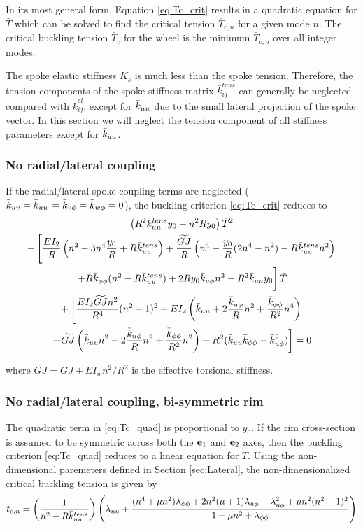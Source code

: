 \documentclass[\rootdir/thesis.tex]{subfiles}
\begin{document}
In its most general form, Equation \eqref{eq:Tc_crit} results in a quadratic equation for $\bar{T}$ which can be solved to find the critical tension $\bar{T}_{c,n}$ for a given mode $n$. The critical buckling tension $\bar{T}_c$ for the wheel is the minimum $\bar{T}_{c,n}$ over all integer modes.

The spoke elastic stiffness $K_s$ is much less than the spoke tension. Therefore, the tension components of the spoke stiffness matrix $\bar{k}_{ij}^{tens}$ can generally be neglected compared with $\bar{k}_{ij}^{el}$, except for $\bar{k}_{uu}$ due to the small lateral projection of the spoke vector. In this section we will neglect the tension component of all stiffness parameters except for $\bar{k}_{uu}$.

\subsubsection*{No radial/lateral coupling}
If the radial/lateral spoke coupling terms are neglected ($\bar{k}_{uv}=\bar{k}_{uw}=\bar{k}_{v\phi}=\bar{k}_{w\phi}=0$), the buckling criterion \eqref{eq:Tc_crit} reduces to
\begin{multline}
\label{eq:Tc_quad}
\left(R^2\bar{k}_{uu}^{tens}y_0 - n^2Ry_0 \right)\bar{T}^2\\
-\left[\frac{EI_2}{R}\left(n^2 - 3n^4 \frac{y_0}{R} + R\bar{k}_{uu}^{tens}\right)
       +\frac{\widetilde{GJ}}{R}\left(n^4 - \frac{y_0}{R}(2n^4 - n^2) - R\bar{k}_{uu}^{tens}n^2\right) \right.\\
       \left. +R\bar{k}_{\phi\phi} (n^2 - R\bar{k}_{uu}^{tens}) + 2Ry_0\bar{k}_{u\phi} n^2 - R^2\bar{k}_{uu} y_0 \vphantom{\frac12} \right]\bar{T}\\
+\left[\frac{EI_2 \widetilde{GJ} n^2}{R^4}(n^2-1)^2
       +EI_2\left(\bar{k}_{uu} + 2\frac{\bar{k}_{u\phi}}{R}n^2 + \frac{\bar{k}_{\phi\phi}}{R^2}n^4\right) \right.\\
       \left. +\widetilde{GJ}\left(\bar{k}_{uu} n^2 + 2\frac{\bar{k}_{u\phi}}{R}n^2 + \frac{\bar{k}_{\phi\phi}}{R^2}n^2\right)
       +R^2(\bar{k}_{uu}\bar{k}_{\phi\phi} - \bar{k}_{u\phi}^2)\right] = 0
\end{multline}

where $\widetilde{GJ} = GJ + EI_wn^2/R^2$ is the effective torsional stiffness.

\subsubsection*{No radial/lateral coupling, bi-symmetric rim}
The quadratic term in \eqref{eq:Tc_quad} is proportional to $y_0$. If the rim cross-section is assumed to be symmetric across both the $\mathbf{e}_1$ and $\mathbf{e}_2$ axes, then the buckling criterion \eqref{eq:Tc_quad} reduces to a linear equation for $\bar{T}$. Using the non-dimensional paremeters defined in Section \ref{sec:Lateral}, the non-dimensionalized critical buckling tension is given by
\begin{equation}
\label{eq:Tcn_lin}
t_{c,n} = \left(\frac{1}{n^2 - R\bar{k}_{uu}^{tens}}\right)
\left(\lambda_{uu}
      +\frac{(n^4 + \mu n^2)\lambda_{\phi\phi}
             +2n^2(\mu + 1)\lambda_{u\phi} - \lambda_{u\phi}^2
             +\mu n^2(n^2-1)^2}
        {1 + \mu n^2 + \lambda_{\phi\phi}}\right)
\end{equation}
\end{document}
